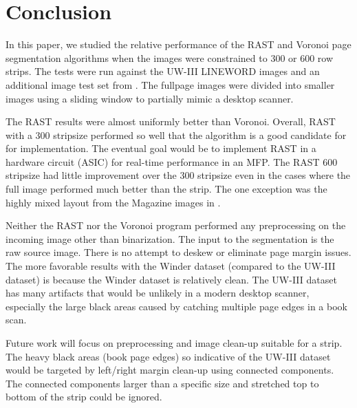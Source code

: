 \documentclass[conference]{IEEEtran}
\begin{document}

\section{Conclusion}

In this paper, we studied the relative performance of the RAST and Voronoi page
segmentation algorithms when the images were constrained to 300 or 600 row
strips. The tests were run against the UW-III LINEWORD images and an additional
image test set from \cite{winder2010extending}. The fullpage images were divided
into smaller images using a sliding window to partially mimic a desktop
scanner.

The RAST results were almost uniformly better than Voronoi. Overall, RAST with
a 300 stripsize performed so well that the algorithm is a good candidate
for for implementation. The eventual goal would be to implement RAST in a
hardware circuit (ASIC) for real-time performance in an MFP.  The RAST 600
stripsize had little improvement over the 300 stripsize even in the cases where
the full image performed much better than the strip. The one exception was the
highly mixed layout from the Magazine images in \cite{winder2010extending}.

Neither the RAST nor the Voronoi program performed any preprocessing on the incoming
image other than binarization. The input to the segmentation is the raw source
image. There is no attempt to deskew or eliminate page margin issues. The more
favorable results with the Winder dataset (compared to the UW-III dataset) is
because the Winder dataset is relatively clean. The UW-III dataset has many
artifacts that would be unlikely in a modern desktop scanner, especially the
large black areas caused by catching multiple page edges in a book scan. 


Future work will focus on preprocessing and image clean-up suitable for a
strip. The heavy black areas (book page edges) so indicative of the UW-III
dataset would be targeted by left/right margin clean-up using connected
components. The connected components larger than a specific size and 
stretched top to bottom of the strip could be ignored.
\end{document}
